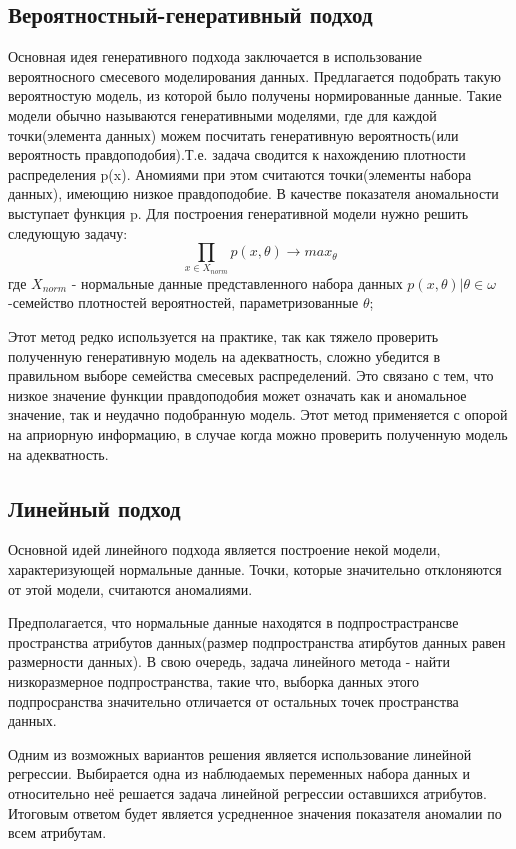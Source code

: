 \subsection{Вероятностный-генеративный подход}
Основная идея генеративного подхода заключается в использование вероятносного смесевого моделирования данных. Предлагается подобрать такую вероятностую модель, из которой было получены нормированные данные. Такие модели обычно называются генеративными моделями, где для каждой точки(элемента данных) можем посчитать генеративную вероятность(или вероятность правдоподобия).Т.е. задача  сводится к нахождению плотности распределения p(x). Аномиями при этом  считаются точки(элементы набора данных), имеющию низкое правдоподобие. В качестве показателя аномальности выступает функция p.
Для построения генеративной модели нужно решить следующую задачу:
	\begin{equation}
	\prod \limits_{x \in X_{norm}} p(x,\theta)  \rightarrow max_\theta
		\end{equation}
		где $ X_{norm}$ - нормальные данные представленного набора данных ${p(x,\theta)|\theta \in \omega}$ -семейство плотностей вероятностей, параметризованные $\theta$;
		
Этот метод редко используется на практике, так как тяжело проверить полученную генеративную модель на адекватность, сложно  убедится в правильном выборе семейства смесевых распределений. Это связано с тем, что низкое значение функции правдоподобия может означать как и аномальное значение, так и неудачно подобранную модель. Этот метод применяется с опорой на априорную информацию, в случае когда можно проверить полученную модель на адекватность.
\subsection{Линейный подход}
Основной идей линейного подхода является построение некой  модели, характеризующей нормальные данные. Точки, которые значительно отклоняются от этой модели, считаются аномалиями.

Предполагается, что нормальные данные  находятся в подпрострастрансве пространства атрибутов данных(размер подпространства атирбутов данных равен размерности данных). В свою очередь, задача линейного метода - найти низкоразмерное подпространства, такие что, выборка данных этого подпросранства значительно отличается от остальных точек пространства данных.

Одним из возможных вариантов решения является использование линейной регрессии. Выбирается одна из наблюдаемых переменных  набора данных и относительно неё решается задача линейной регрессии оставшихся атрибутов. Итоговым ответом будет является усредненное значения показателя аномалии по всем атрибутам. 

